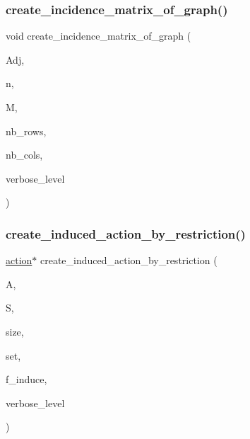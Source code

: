 \subsubsection{\texorpdfstring{create\+\_\+incidence\+\_\+matrix\+\_\+of\+\_\+graph()}{create\_incidence\_matrix\_of\_graph()}}
{\footnotesize\ttfamily void create\+\_\+incidence\+\_\+matrix\+\_\+of\+\_\+graph (\begin{DoxyParamCaption}\item[{\mbox{\hyperlink{galois_8h_a09fddde158a3a20bd2dcadb609de11dc}{I\+NT}} $\ast$}]{Adj,  }\item[{\mbox{\hyperlink{galois_8h_a09fddde158a3a20bd2dcadb609de11dc}{I\+NT}}}]{n,  }\item[{\mbox{\hyperlink{galois_8h_a09fddde158a3a20bd2dcadb609de11dc}{I\+NT}} $\ast$\&}]{M,  }\item[{\mbox{\hyperlink{galois_8h_a09fddde158a3a20bd2dcadb609de11dc}{I\+NT}} \&}]{nb\+\_\+rows,  }\item[{\mbox{\hyperlink{galois_8h_a09fddde158a3a20bd2dcadb609de11dc}{I\+NT}} \&}]{nb\+\_\+cols,  }\item[{\mbox{\hyperlink{galois_8h_a09fddde158a3a20bd2dcadb609de11dc}{I\+NT}}}]{verbose\+\_\+level }\end{DoxyParamCaption})}

\mbox{\label{action__global_8_c_a97a1eb77cd362a0eb6872a2bc3b19b0e}} 
\subsubsection{\texorpdfstring{create\+\_\+induced\+\_\+action\+\_\+by\+\_\+restriction()}{create\_induced\_action\_by\_restriction()}}
{\footnotesize\ttfamily \mbox{\hyperlink{classaction}{action}}$\ast$ create\+\_\+induced\+\_\+action\+\_\+by\+\_\+restriction (\begin{DoxyParamCaption}\item[{\mbox{\hyperlink{classaction}{action}} $\ast$}]{A,  }\item[{\mbox{\hyperlink{classsims}{sims}} $\ast$}]{S,  }\item[{\mbox{\hyperlink{galois_8h_a09fddde158a3a20bd2dcadb609de11dc}{I\+NT}}}]{size,  }\item[{\mbox{\hyperlink{galois_8h_a09fddde158a3a20bd2dcadb609de11dc}{I\+NT}} $\ast$}]{set,  }\item[{\mbox{\hyperlink{galois_8h_a09fddde158a3a20bd2dcadb609de11dc}{I\+NT}}}]{f\+\_\+induce,  }\item[{\mbox{\hyperlink{galois_8h_a09fddde158a3a20bd2dcadb609de11dc}{I\+NT}}}]{verbose\+\_\+level }\end{DoxyParamCaption})}

